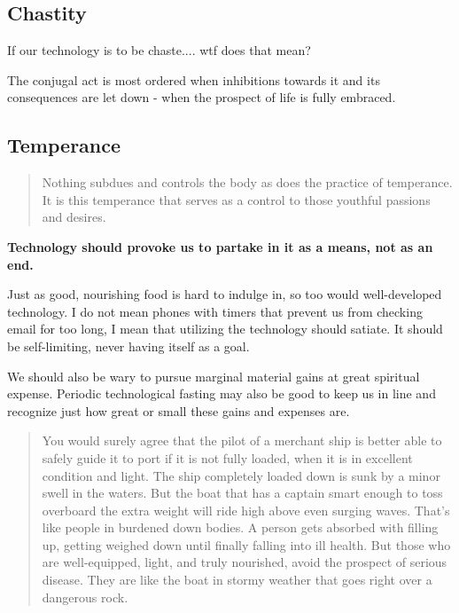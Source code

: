 \documentclass[letterpaper]{article}
\begin{document}
\subsection{Chastity}

If our technology is to be chaste.... wtf does that mean?

The conjugal act is most ordered when inhibitions towards it and its consequences are let down - when the prospect of life is fully embraced.

\subsection{Temperance}

\begin{quote}
  Nothing subdues and controls the body as does the practice of temperance. It is this temperance that serves as a control to those youthful passions and desires.
\end{quote}

\textbf{Technology should provoke us to partake in it as a means, not as an end.} 

Just as good, nourishing food is hard to indulge in, so too would well-developed technology. I do not mean phones with timers that prevent us from checking email for too long, I mean that utilizing the technology should satiate. It should be self-limiting, never having itself as a goal.

We should also be wary to pursue marginal material gains at great spiritual expense. Periodic technological fasting may also be good to keep us in line and recognize just how great or small these gains and expenses are.

\begin{quote}
  You would surely agree that the pilot of a merchant ship is better able to safely guide it to port if it is not fully loaded, when it is in excellent condition and light. The ship completely loaded down is sunk by a minor swell in the waters. But the boat that has a captain smart enough to toss overboard the extra weight will ride high above even surging waves.
  That’s like people in burdened down bodies. A person gets absorbed with filling up, getting weighed down until finally falling into ill health. But those who are well-equipped, light, and truly nourished, avoid the prospect of serious disease. They are like the boat in stormy weather that goes right over a dangerous rock.
\end{quote}
\end{document}
